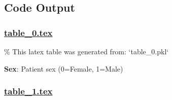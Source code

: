 \documentclass[11pt]{article}
\begin{document}
\subsection{Code Output}

\subsubsection*{\hyperlink{code-LaTeX Table Design-table-0-tex}{table\_0.tex}}

\begin{codeoutput}
\% This latex table was generated from: `table\_0.pkl`
\begin{table}[h]
\caption{Descriptive statistics of weight stratified by sex.}
\label{table:descriptive\_sex\_weight}
\begin{threeparttable}
\renewcommand{\TPTminimum}{\linewidth}
\begin{tablenotes}
\footnotesize
\item \textbf{Sex}: Patient sex (0=Female, 1=Male)
\end{tablenotes}
\end{threeparttable}
\end{table}
\end{codeoutput}

\subsubsection*{\hyperlink{code-LaTeX Table Design-table-1-tex}{table\_1.tex}}
\end{document}
